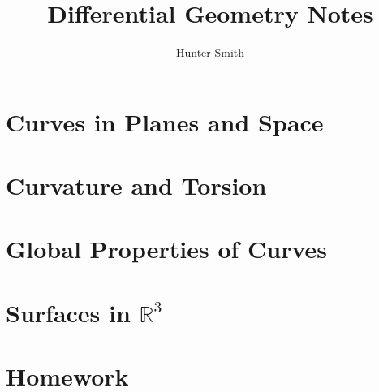 \documentclass[11pt]{article}
\title{Differential Geometry Notes}
\date{}
\author{Hunter Smith}
\theoremstyle{definition}
\theoremstyle{plain}
\theoremstyle{remark}
\begin{document}
  \maketitle
  \tableofcontents
  \newpage

  \section{Curves in Planes and Space}
      
      
      

  \section{Curvature and Torsion}
      
      

  \section{Global Properties of Curves}
      
      

  \section{Surfaces in $\mathbb{R}^3$}
      

  \section{Homework}
      
      

  \printindex
\end{document}
